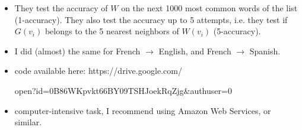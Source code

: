 \documentclass{beamer}
\begin{document}
\begin{frame}


\begin{itemize}



\item They test the accuracy of $W$ on the next 1000 most common words of the list (1-accuracy). They also test the accuracy up to 5 attempts, i.e. they test if $G(v_i)$ belongs to the 5 nearest neighbors of $W(v_i)$ (5-accuracy). 

\item I did (almost) the same for French $\rightarrow$ English, and French $\rightarrow$ Spanish. 

\bigskip

\item code available here: https://drive.google.com/

open?id=0B86WKpvkt66BY09TSHJoekRqZjg\&authuser=0  

\item computer-intensive task, I recommend using Amazon Web Services, or similar. 

\end{itemize}

\end{frame}
\end{document}
